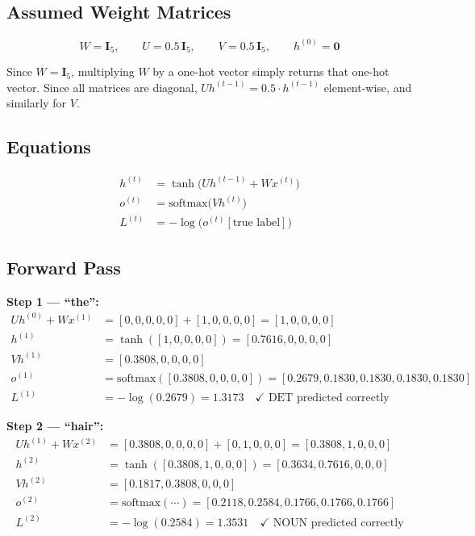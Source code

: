 \subsection{Assumed Weight Matrices}

\begin{equation}
    W = \mathbf{I}_5, \qquad U = 0.5\,\mathbf{I}_5, \qquad V = 0.5\,\mathbf{I}_5, \qquad h^{(0)} = \mathbf{0}
\end{equation}

Since $W = \mathbf{I}_5$, multiplying $W$ by a one-hot vector simply returns that
one-hot vector. Since all matrices are diagonal, $U h^{(t-1)} = 0.5 \cdot h^{(t-1)}$
element-wise, and similarly for $V$.

\subsection{Equations}

\begin{align}
    h^{(t)} &= \tanh\!\bigl(U h^{(t-1)} + W x^{(t)}\bigr) \\
    o^{(t)} &= \text{softmax}\!\bigl(V h^{(t)}\bigr) \\
    L^{(t)} &= -\log\!\bigl(o^{(t)}[\text{true label}]\bigr)
\end{align}

\subsection{Forward Pass}

\textbf{Step 1 --- ``the'':}
\begin{align*}
    U h^{(0)} + W x^{(1)} &= [0,0,0,0,0] + [1,0,0,0,0] = [1,0,0,0,0] \\
    h^{(1)} &= \tanh([1,0,0,0,0]) = [0.7616,0,0,0,0] \\
    V h^{(1)} &= [0.3808,0,0,0,0] \\
    o^{(1)} &= \text{softmax}([0.3808,0,0,0,0]) = [0.2679,0.1830,0.1830,0.1830,0.1830] \\
    L^{(1)} &= -\log(0.2679) = 1.3173 \quad \checkmark \text{ DET predicted correctly}
\end{align*}

\textbf{Step 2 --- ``hair'':}
\begin{align*}
    U h^{(1)} + W x^{(2)} &= [0.3808,0,0,0,0] + [0,1,0,0,0] = [0.3808,1,0,0,0] \\
    h^{(2)} &= \tanh([0.3808,1,0,0,0]) = [0.3634,0.7616,0,0,0] \\
    V h^{(2)} &= [0.1817,0.3808,0,0,0] \\
    o^{(2)} &= \text{softmax}(\cdots) = [0.2118,0.2584,0.1766,0.1766,0.1766] \\
    L^{(2)} &= -\log(0.2584) = 1.3531 \quad \checkmark \text{ NOUN predicted correctly}
\end{align*}

